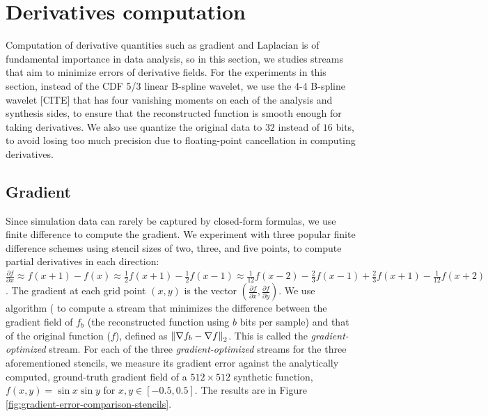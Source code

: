 \section{Derivatives computation}

Computation of derivative quantities such as gradient and Laplacian is of fundamental importance in
data analysis, so in this section, we studies streams that aim to minimize errors of derivative
fields. For the experiments in this section, instead of the CDF 5/3 linear B-spline wavelet, we use
the 4-4 B-spline wavelet [CITE] that has four vanishing moments on each of the analysis and
synthesis sides, to ensure that the reconstructed function is smooth enough for taking derivatives.
We also use quantize the original data to $32$ instead of $16$ bits, to avoid losing too much
precision due to floating-point cancellation in computing derivatives.

\subsection{Gradient}

Since simulation data can rarely be captured by closed-form formulas, we use finite difference to
compute the gradient. We experiment with three popular finite difference schemes using stencil sizes
of two, three, and five points, to compute partial derivatives in each direction: $\frac{\partial
f}{\partial x}\approx f(x+1)-f(x) \approx \frac{1}{2}f(x+1)-\frac{1}{2}f(x-1) \approx
\frac{1}{12}f(x-2)-\frac{2}{3}f(x-1)+\frac{2}{3}f(x+1)-\frac{1}{12}f(x+2)$.  The gradient at each
grid point $(x,y)$ is the vector $(\frac{\partial f}{\partial x},\frac{\partial f}{\partial y})$. We
use algorithm ( to compute a stream that minimizes the difference between
the gradient field of $f_b$ (the reconstructed function using $b$ bits per sample) and that of the
original function ($f$), defined as $\left\lVert\nabla f_b-\nabla f\right\rVert_2$. This is called the
\emph{gradient-optimized} stream. For each of the three \emph{gradient-optimized} streams for the
three aforementioned stencils, we measure its gradient error against the analytically computed,
ground-truth gradient field of a $512\times 512$ synthetic function, $f(x,y)=\sin x\sin y$ for
$x,y\in[-0.5,0.5]$. The results are in Figure \ref{fig:gradient-error-comparison-stencils}.

